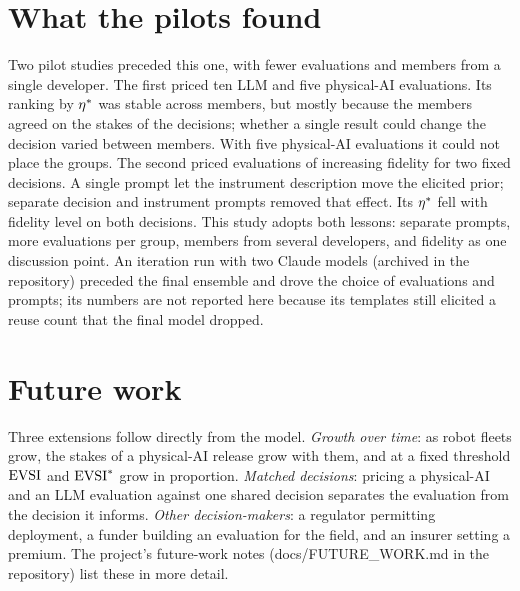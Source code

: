 \documentclass{article}
\begin{document}
\FloatBarrier
\section{What the pilots found}
\label{sec:pilots}

Two pilot studies preceded this one, with fewer evaluations and members from a single developer. The first priced ten LLM and five physical-AI evaluations. Its ranking by $\eta^{*}$ was stable across members, but mostly because the members agreed on the stakes of the decisions; whether a single result could change the decision varied between members. With five physical-AI evaluations it could not place the groups. The second priced evaluations of increasing fidelity for two fixed decisions. A single prompt let the instrument description move the elicited prior; separate decision and instrument prompts removed that effect. Its $\eta^{*}$ fell with fidelity level on both decisions. This study adopts both lessons: separate prompts, more evaluations per group, members from several developers, and fidelity as one discussion point. An iteration run with two Claude models (archived in the repository) preceded the final ensemble and drove the choice of evaluations and prompts; its numbers are not reported here because its templates still elicited a reuse count that the final model dropped.

\FloatBarrier
\section{Future work}
\label{sec:future}

Three extensions follow directly from the model. \emph{Growth over time}: as robot fleets grow, the stakes of a physical-AI release grow with them, and at a fixed threshold $\mathrm{EVSI}$ and $\mathrm{EVSI}^{*}$ grow in proportion. \emph{Matched decisions}: pricing a physical-AI and an LLM evaluation against one shared decision separates the evaluation from the decision it informs. \emph{Other decision-makers}: a regulator permitting deployment, a funder building an evaluation for the field, and an insurer setting a premium. The project's future-work notes (docs/FUTURE\_WORK.md in the repository) list these in more detail.


\end{document}
